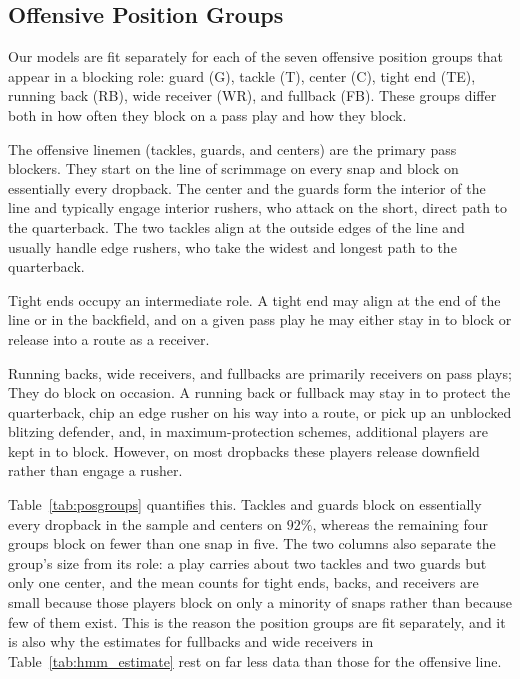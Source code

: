 \documentclass[USenglish]{article}
\theoremstyle{dgthm}
\theoremstyle{dgdef}
\begin{document}
\clearpage
\begin{appendices}
\section{Offensive Position Groups}
\label{sec:positions}
Our models are fit separately for each of the seven offensive position groups that appear in a blocking role: guard (G), tackle (T), center (C), tight end (TE), running back (RB), wide receiver (WR), and fullback (FB). These groups differ both in how often they block on a pass play and how they block.

The offensive linemen (tackles, guards, and centers) are the primary pass blockers. They start on the line of scrimmage on every snap and block on essentially every dropback. The center and the guards form the interior of the line and typically engage interior rushers, who attack on the short, direct path to the quarterback. The two tackles align at the outside edges of the line and usually handle edge rushers, who take the widest and longest path to the quarterback.

Tight ends occupy an intermediate role. A tight end may align at the end of the line or in the backfield, and on a given pass play he may either stay in to block or release into a route as a receiver. 

Running backs, wide receivers, and fullbacks are primarily receivers on pass plays; They do block on occasion. A running back or fullback may stay in to protect the quarterback, chip an edge rusher on his way into a route, or pick up an unblocked blitzing defender, and, in maximum-protection schemes, additional players are kept in to block. However, on most dropbacks these players release downfield rather than engage a rusher.

Table~\ref{tab:posgroups} quantifies this. Tackles and guards block on essentially every dropback in the sample and centers on $92\%$, whereas the remaining four groups block on fewer than one snap in five. The two columns also separate the group's size from its role: a play carries about two tackles and two guards but only one center, and the mean counts for tight ends, backs, and receivers are small because those players block on only a minority of snaps rather than because few of them exist. This is the reason the position groups are fit separately, and it is also why the estimates for fullbacks and wide receivers in Table~\ref{tab:hmm_estimate} rest on far less data than those for the offensive line.


\end{appendices}
\end{document}
